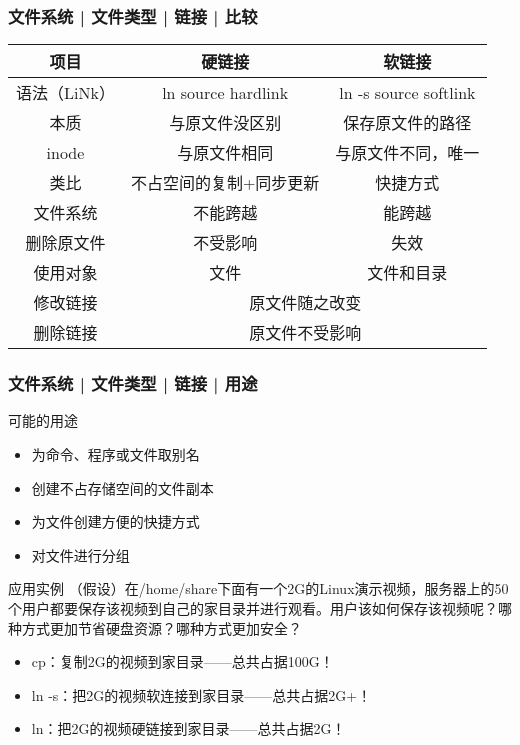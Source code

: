 \begin{frame}
  \frametitle{文件系统 | 文件类型 | 链接 | \alert{比较}}
  \begin{table}
    \centering
    \begin{tabularx}{0.94\textwidth}{ccc}
      \hline
      \rowcolor{blue!50}项目 & 硬链接 & 软链接\\
      \hline
      语法（LiNk） & ln source hardlink & ln -s source softlink\\
      本质 & 与原文件没区别 & 保存原文件的路径\\
      inode & 与原文件相同 & 与原文件不同，唯一\\
      类比 & 不占空间的复制+同步更新 & 快捷方式\\
      文件系统 & 不能跨越 & 能跨越\\
      删除原文件 & 不受影响 & 失效\\
      使用对象 & 文件 & 文件和目录\\
      \hline
      修改链接 & \multicolumn{2}{c}{原文件随之改变}\\
      删除链接 & \multicolumn{2}{c}{原文件不受影响}\\
      \hline
    \end{tabularx}
  \end{table}
\end{frame}

\begin{frame}
  \frametitle{文件系统 | 文件类型 | 链接 | 用途}
  \begin{block}{可能的用途}
  \begin{itemize}
    \item 为命令、程序或文件取别名
    \item 创建不占存储空间的文件副本
    \item 为文件创建方便的快捷方式
    \item 对文件进行分组
  \end{itemize}
  \end{block}
  \pause
  \begin{block}{应用实例}
    （假设）在/home/share下面有一个2G的Linux演示视频，服务器上的50个用户都要保存该视频到自己的家目录并进行观看。用户该如何保存该视频呢？哪种方式更加节省硬盘资源？哪种方式更加安全？
    \begin{itemize}
      \item cp：复制2G的视频到家目录——总共占据100G！
      \item ln -s：把2G的视频软连接到家目录——总共占据2G+！
      \item ln：把2G的视频硬链接到家目录——总共占据2G！
    \end{itemize}
  \end{block}
\end{frame}

